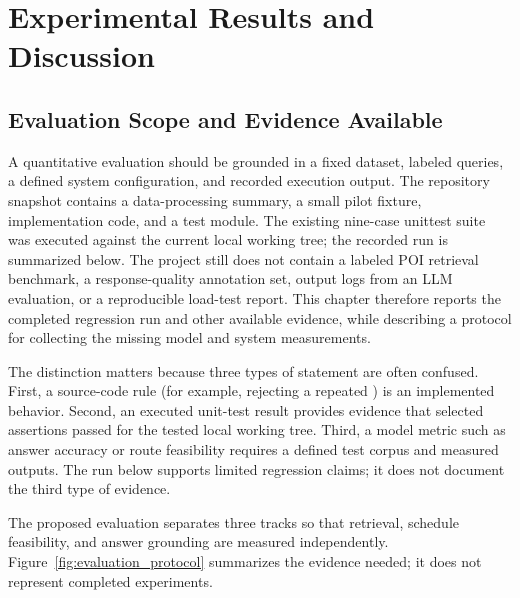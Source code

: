 \chapter{Experimental Results and Discussion}
\label{chap:results_discussion}

\section{Evaluation Scope and Evidence Available}

A quantitative evaluation should be grounded in a fixed dataset, labeled queries, a defined system configuration, and recorded execution output. The repository snapshot contains a data-processing summary, a small pilot fixture, implementation code, and a test module. The existing nine-case unittest suite was executed against the current local working tree; the recorded run is summarized below. The project still does not contain a labeled POI retrieval benchmark, a response-quality annotation set, output logs from an LLM evaluation, or a reproducible load-test report. This chapter therefore reports the completed regression run and other available evidence, while describing a protocol for collecting the missing model and system measurements.

The distinction matters because three types of statement are often confused. First, a source-code rule (for example, rejecting a repeated ) is an implemented behavior. Second, an executed unit-test result provides evidence that selected assertions passed for the tested local working tree. Third, a model metric such as answer accuracy or route feasibility requires a defined test corpus and measured outputs. The run below supports limited regression claims; it does not document the third type of evidence.

The proposed evaluation separates three tracks so that retrieval, schedule feasibility, and answer grounding are measured independently. Figure~\ref{fig:evaluation_protocol} summarizes the evidence needed; it does not represent completed experiments.

